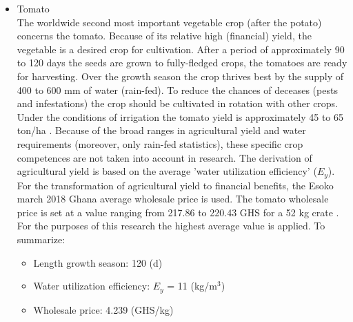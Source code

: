 \begin{itemize}
\item{Tomato} \\
The worldwide second most important vegetable crop (after the potato) concerns the tomato. Because of its relative high (financial) yield, the vegetable is a desired crop for cultivation. After a period of approximately 90 to 120 days the seeds are grown to fully-fledged crops, the tomatoes are ready for harvesting. Over the growth season the crop thrives best by the supply of 400 to 600 mm of water (rain-fed). To reduce the chances of deceases (pests and infestations) the crop should be cultivated in rotation with other crops. Under the conditions of irrigation the tomato yield is approximately 45 to 65 ton/ha \citep{FAO2018a}. Because of the broad ranges in agricultural yield and water requirements (moreover, only rain-fed statistics), these specific crop competences are not taken into account in research. The derivation of agricultural yield is based on the average 'water utilization efficiency' ($E_y$). For the transformation of agricultural yield to financial benefits, the Esoko march 2018 Ghana average wholesale price is used. The tomato wholesale price is set at a value ranging from 217.86 to 220.43 GHS for a 52 kg crate \citep{ModernGhana2018}. For the purposes of this research the highest average value is applied. To summarize: 
\begin{itemize}
\item{Length growth season: 120 (d)}
\item{Water utilization efficiency: $E_y$ = 11 (kg/m$^3$)}
\item{Wholesale price: 4.239 (GHS/kg)}
\end{itemize}


\end{itemize}
